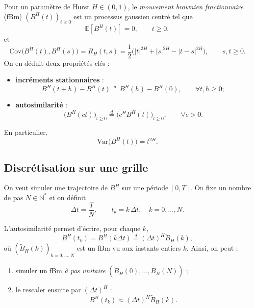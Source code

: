 \documentclass[11pt,a4paper]{article}
\newcommand{\E}{\mathbb{E}}
\newcommand{\Var}{\mathrm{Var}}
\newcommand{\Cov}{\mathrm{Cov}}
\newcommand{\1}{\mathbf{1}}
\newcommand{\bH}{B^{H}}
\begin{document}
Pour un paramètre de Hurst $H\in(0,1)$, le \emph{mouvement brownien fractionnaire}
(fBm) $(\bH(t))_{t\ge 0}$ est un processus gaussien centré tel que
\begin{equation}
  \E[\bH(t)] = 0,\qquad t\ge 0,
\end{equation}
et
\begin{equation}
  \Cov\bigl(\bH(t),\bH(s)\bigr)
  = R_H(t,s)
  = \frac{1}{2}\bigl(|t|^{2H} + |s|^{2H} - |t-s|^{2H}\bigr),
  \qquad s,t\ge 0.
\end{equation}
On en déduit deux propriétés clés :
\begin{itemize}
  \item \textbf{incréments stationnaires} :
  \[
    \bH(t+h)-\bH(t)
    \stackrel{d}{=}
    \bH(h)-\bH(0), \qquad \forall t,h\ge 0 ;
  \]
  \item \textbf{autosimilarité} :
  \[
    \bigl(\bH(ct)\bigr)_{t\ge 0}
    \stackrel{d}{=}
    \bigl(c^H \bH(t)\bigr)_{t\ge 0},\qquad \forall c>0.
  \]
\end{itemize}
En particulier,
\begin{equation}
  \Var\bigl(\bH(t)\bigr) = t^{2H}.
\end{equation}

\subsection{Discrétisation sur une grille}

On veut simuler une trajectoire de $\bH$ sur une période $[0,T]$.
On fixe un nombre de pas $N\in\mathbb{N}^\ast$ et on définit
\begin{equation}
  \Delta t = \frac{T}{N},\qquad
  t_k = k\,\Delta t,\quad k = 0,\dots,N.
\end{equation}

L'autosimilarité permet d'écrire, pour chaque $k$,
\begin{equation}
  \bH(t_k)
  = \bH(k\Delta t)
  \stackrel{d}{=} (\Delta t)^H \widetilde B_H(k),
\end{equation}
où $(\widetilde B_H(k))_{k=0,\dots,N}$ est un fBm vu aux instants entiers $k$.
Ainsi, on peut :
\begin{enumerate}
  \item simuler un fBm \emph{à pas unitaire} $(\widetilde B_H(0),\dots,\widetilde B_H(N))$ ;
  \item le rescaler ensuite par $(\Delta t)^H$ :
  \[
    \bH(t_k) \approx (\Delta t)^H \widetilde B_H(k).
  \]
\end{enumerate}
\end{document}
